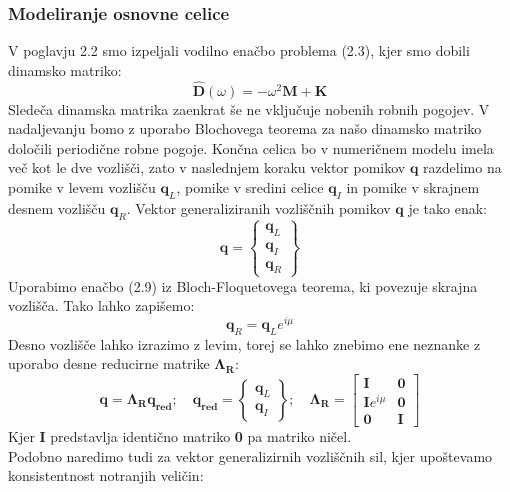 \documentclass[12pt]{report}
\begin{document}
\subsubsection{Modeliranje osnovne celice}
V poglavju 2.2 smo izpeljali vodilno enačbo problema (2.3), kjer smo dobili dinamsko matriko:
\begin{equation}
  \mathbf{\hat{D}}(\omega)= -{\omega}^2 \mathbf{M}+\mathbf{K}
\end{equation}
Sledeča dinamska matrika zaenkrat še ne vključuje nobenih robnih pogojev. V nadaljevanju bomo z uporabo Blochovega teorema za našo
dinamsko matriko določili periodične robne pogoje. Končna celica bo v numeričnem modelu imela več kot le dve vozlišči, zato v naslednjem koraku vektor pomikov $\mathbf{q}$
razdelimo na pomike v levem vozlišču $\mathbf{q}_L$, pomike v sredini celice $\mathbf{q}_I$ in pomike v skrajnem desnem vozlišču $\mathbf{q}_R$. Vektor generaliziranih vozliščnih pomikov $\mathbf{q}$
je tako enak:
\begin{equation}
  \mathbf{q}=
    \begin{Bmatrix}
      \mathbf{q}_L \\
      \mathbf{q}_I \\
      \mathbf{q}_R
    \end{Bmatrix}
\end{equation}
Uporabimo enačbo (2.9) iz Bloch-Floquetovega teorema, ki povezuje skrajna vozlišča. Tako lahko zapišemo:
\begin{equation}
  \mathbf{q}_R = \mathbf{q}_L e^{i\mu}
\end{equation}
Desno vozlišče lahko izrazimo z levim, torej se lahko znebimo ene neznanke z uporabo desne reducirne matrike $\mathbf{\Lambda_R}$:
\begin{equation}
  \mathbf{q}=\mathbf{\Lambda_R q_{red}}; \quad 
  \mathbf{q_{red}} = \begin{Bmatrix}
    \mathbf{q}_L \\
    \mathbf{q}_I
  \end{Bmatrix}; \quad
  \mathbf{\Lambda_R} = \begin{bmatrix}
    \mathbf{I} & \mathbf{0} \\
    \mathbf{I}e^{i\mu} & \mathbf{0} \\
    \mathbf{0} & \mathbf{I}
  \end{bmatrix}
\end{equation}
Kjer \textbf{I} predstavlja identično matriko \textbf{0} pa matriko ničel.\\
Podobno naredimo tudi za vektor generalizirnih vozliščnih sil, kjer upoštevamo konsistentnost notranjih veličin:
\end{document}
